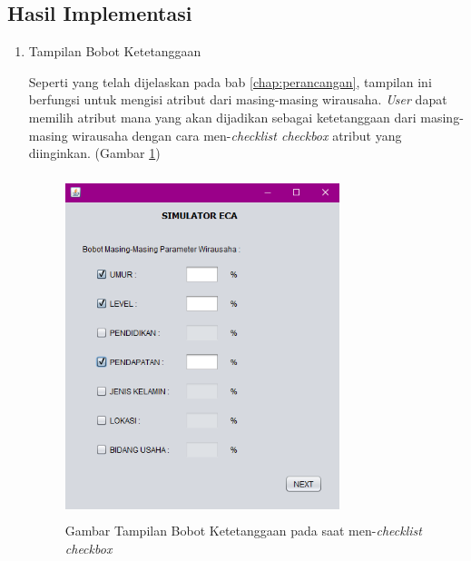 \subsection{Hasil Implementasi}
\begin{enumerate}
	\item Tampilan Bobot Ketetanggaan
	
	
	Seperti yang telah dijelaskan pada bab \ref{chap:perancangan}, tampilan ini berfungsi untuk mengisi atribut dari masing-masing wirausaha. \textit{User} dapat memilih atribut mana yang akan dijadikan sebagai ketetanggaan dari masing-masing wirausaha dengan cara men-\textit{checklist checkbox} atribut yang diinginkan. (Gambar \ref{fig:tampilanBobot1})
	
	
	\begin{figure} [H]
	\centering  
	\includegraphics[width=8cm, height=10cm]{tampilanImplementasiBobot} 
		\caption[Gambar Tampilan Bobot Ketetanggaan]{Gambar Tampilan Bobot Ketetanggaan pada saat men-\textit{checklist checkbox}}
	\label{fig:tampilanBobot1} 
\end{figure}


\end{enumerate}
